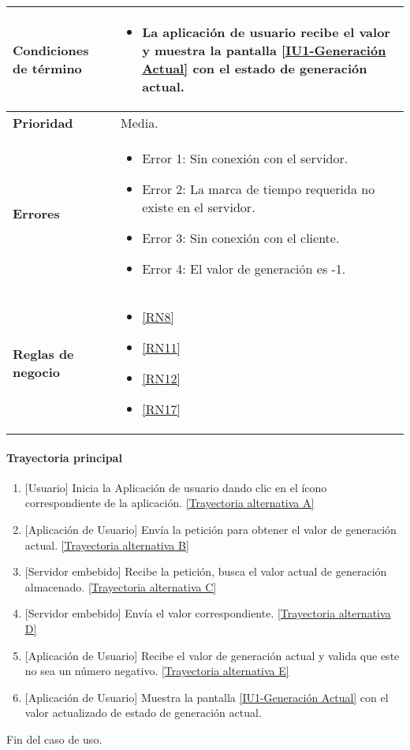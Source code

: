 \begin{longtable}{|J{5cm}|J{10.3cm}|}
	\textbf{Condiciones de término} & 
		\begin{itemize}
			\item La aplicación de usuario recibe el valor y muestra la pantalla \hyperref[fig:monitoreo]{[IU1-Generación Actual]} con el estado de generación actual.
		\end{itemize} \\ \hline 
	\textbf{Prioridad} & 
		Media. \\ \hline
	\textbf{Errores} & 
		\begin{itemize}
		    \item \label{CUU1.1:Error1} Error 1: Sin conexión con el servidor.
			\item \label{CUU1.1:Error2} Error 2: La marca de tiempo requerida no existe en el servidor.
		    \item \label{CUU1.1:Error3} Error 3: Sin conexión con el cliente.
		    \item \label{CUU1.1:Error4} Error 4: El valor de generación es -1.
		\end{itemize} \\ \hline
	\textbf{Reglas de negocio} & 
		\begin{itemize}
		    \item \ref{RN8}
			\item \ref{RN11}
			\item \ref{RN12}
			\item \ref{RN17}
		\end{itemize} \\ \hline
\end{longtable}

\paragraph{Trayectoria principal}
    \label{SUB-U-CU1.1:TP}
	\begin{enumerate}
	    \item {[Usuario]} Inicia la Aplicación de usuario dando clic en el ícono correspondiente de la aplicación. \hyperref[SUB-U-CU1.1:TA]{[Trayectoria alternativa A]}
	    \item {[Aplicación de Usuario]} Envía la petición para obtener el valor de generación actual. \hyperref[SUB-U-CU1.1:TB]{[Trayectoria alternativa B]} 
	    \item {[Servidor embebido]} Recibe la petición, busca el valor actual de generación almacenado. \hyperref[SUB-U-CU1.1:TC]{[Trayectoria alternativa C]}
	    \item {[Servidor embebido]} Envía el valor correspondiente. \hyperref[SUB-U-CU1.1:TD]{[Trayectoria alternativa D]} 
	    \item {[Aplicación de Usuario]} Recibe el valor de generación actual y valida que este no sea un número negativo. \hyperref[SUB-U-CU1.1:TE]{[Trayectoria alternativa E]} 
	    \item {[Aplicación de Usuario]} Muestra la pantalla \hyperref[fig:monitoreo]{[IU1-Generación Actual]} con el valor actualizado de estado de generación actual.
	\end{enumerate}
	Fin del caso de uso.


